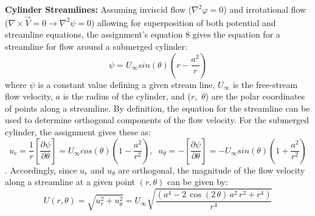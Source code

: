 \documentclass[12pt]{article}
\begin{document}
	\hfill\break\break
	\textbf{Cylinder Streamlines:}
	Assuming inviscid flow ($\nabla^{2}\varphi=0$) and irrotational flow ($\nabla\times\vec{V}=0 \rightarrow \nabla^{2}\psi=0$) allowing for superposition of both potential and streamline equations, the assignment's equation 8 gives the equation for a streamline for flow around a submerged cylinder:
	$$ \psi = U_{\infty}sin(\theta)\left(r-\frac{a^{2}}{r}\right)$$
	where $\psi$ is a constant value defining a given stream line, $U_{\infty}$ is the free-stream flow velocity, $a$ is the radius of the cylinder, and ($r,$ $\theta$) are the polar coordinates of points along a streamline.
	\hfill\break\break
	By definition, the equation for the streamline can be used to determine orthogonal components of the flow velocity. For the submerged cylinder, the assignment gives these as: 
	$$u_{r}=\frac{1}{r}\left[\frac{\partial\psi}{\partial\theta}\right]=U_{\infty}cos(\theta)\left(1-\frac{a^2}{r^2}\right),
	\;\;u_{\theta}=-\left[\frac{\partial\psi}{\partial\theta}\right]=-U_{\infty}sin(\theta)\left(1+\frac{a^2}{r^2}\right)$$.
	\hfill\break
	Accordingly, since $u_r$ and $u_\theta$ are orthogonal, the magnitude of the flow velocity along a streamline at a given point $(r,\theta)$ can be given by:
	$$U(r,\theta)=\sqrt{u_r^2+u_\theta^2}=U_\infty\sqrt{\frac{\left(a^4-2\,\cos\left(2\,\theta\right)\,a^2\,r^2+r^4\right)}{r^4}}$$
\end{document}
